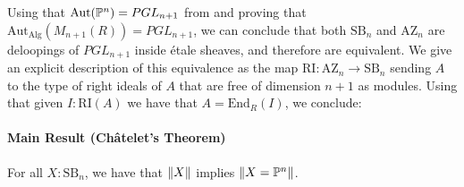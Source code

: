 \documentclass{../util/zariski}
\newcommand{\SB}{\mathrm{SB}}
\newcommand{\RI}{\mathrm{RI}}
\newcommand{\AZ}{\mathrm{AZ}}
\begin{document}
Using that $\mathrm{Aut}(\mathbb{P}^n) = PGL_{n+1}$ from \cite{sag-projective} and proving that $\mathrm{Aut}_{\mathrm{Alg}}(M_{n+1}(R)) = PGL_{n+1}$,
we can conclude that both $\SB_n$ and $\AZ_n$ are deloopings of $PGL_{n+1}$ inside étale sheaves, and therefore are equivalent. We give an explicit description of this equivalence as the map $\RI:\AZ_n\to\SB_n$ sending $A$ to the type of right ideals of $A$ that are free of dimension $n+1$ as modules. Using that given $I:\RI(A)$ we have that $A = \mathrm{End}_R(I)$, we conclude: 
\paragraph{Main Result (Ch\^atelet's Theorem)} For all $X:\SB_n$, we have that $\lVert X \rVert$ implies $\lVert X=\mathbb{P}^n \rVert$.

\printindex
\printbibliography
\end{document}
